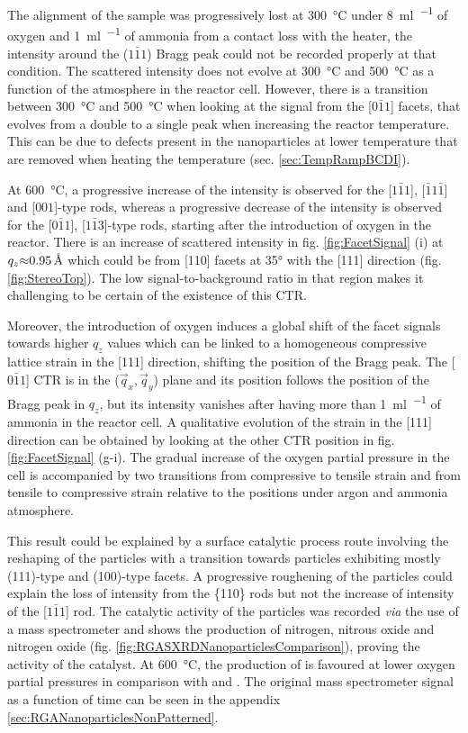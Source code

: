 The alignment of the sample was progressively lost at \qty{300}{\degreeCelsius} under \qty{8}{\ml\per\min} of oxygen and \qty{1}{\ml\per\min} of ammonia from a contact loss with the heater, the intensity around the ($1\bar{1}1$) Bragg peak could not be recorded properly at that condition.
The scattered intensity does not evolve at \qty{300}{\degreeCelsius} and \qty{500}{\degreeCelsius} as a function of the atmosphere in the reactor cell.
However, there is a transition between \qty{300}{\degreeCelsius} and \qty{500}{\degreeCelsius} when looking at the signal from the [$0\bar{1}1$] facets, that evolves from a double to a single peak when increasing the reactor temperature.
This can be due to defects present in the nanoparticles at lower temperature that are removed when heating the temperature (sec. \ref{sec:TempRampBCDI}).

At \qty{600}{\degreeCelsius}, a progressive increase of the intensity is observed for the [$1\bar{1}1$], [$\bar{1}1\bar{1}$] and [$001$]-type rods, whereas a progressive decrease of the intensity is observed for the [$0\bar{1}1$], [$1\bar{1}3$]-type rods, starting after the introduction of oxygen in the reactor.
There is an increase of scattered intensity in fig. \ref{fig:FacetSignal} (i) at $q_z \qty{\approx 0.95}{\angstrom}$ which could be from [110] facets at \ang{35} with the [111] direction (fig. \ref{fig:StereoTop}).
The low signal-to-background ratio in that region makes it challenging to be certain of the existence of this CTR.

Moreover, the introduction of oxygen induces a global shift of the facet signals towards higher $q_z$ values which can be linked to a homogeneous compressive lattice strain in the [111] direction, shifting the position of the Bragg peak.
The [$0\bar{1}1$] CTR is in the ($\vec{q}_x, \vec{q}_y$) plane and its position follows the position of the Bragg peak in $q_z$, but its intensity vanishes after having more than \qty{1}{\ml\per\min} of ammonia in the reactor cell.
A qualitative evolution of the strain in the [111] direction can be obtained by looking at the other CTR position in fig. \ref{fig:FacetSignal} (g-i).
The gradual increase of the oxygen partial pressure in the cell is accompanied by two transitions from compressive to tensile strain and from tensile to compressive strain relative to the positions under argon and ammonia atmosphere.

This result could be explained by a surface catalytic process route involving the reshaping of the particles with a transition towards particles exhibiting mostly (111)-type and (100)-type facets.
A progressive roughening of the particles could explain the loss of intensity from the \{110\} rods but not the increase of intensity of the [$1\bar{1}1$] rod.
The catalytic activity of the particles was recorded \textit{via} the use of a mass spectrometer and shows the production of nitrogen, nitrous oxide and nitrogen oxide (fig. \ref{fig:RGASXRDNanoparticlesComparison}), proving the activity of the catalyst.
At \qty{600}{\degreeCelsius}, the production of \nitrogen is favoured at lower oxygen partial pressures in comparison with \nitrogendioxide and \nitricoxide.
The original mass spectrometer signal as a function of time can be seen in the appendix \ref{sec:RGANanoparticlesNonPatterned}.

